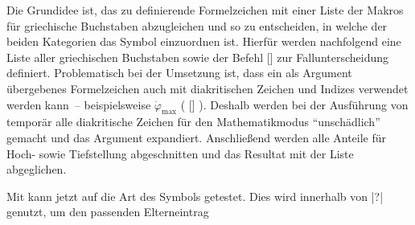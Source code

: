 \documentclass[%
  english,ngerman,%
  cdgeometry=no,DIV=12,automark,%
]{tudscrartcl}
\begin{document}
Die Grundidee ist, das zu definierende Formelzeichen mit einer Liste der Makros 
für griechische Buchstaben abzugleichen und so zu entscheiden, in welche der 
beiden Kategorien das Symbol einzuordnen ist. Hierfür werden nachfolgend eine 
Liste  aller griechischen Buchstaben sowie der Befehl 
[] 
zur Fallunterscheidung definiert. Problematisch bei der Umsetzung ist, dass ein 
als Argument übergebenes Formelzeichen auch mit diakritischen Zeichen und 
Indizes verwendet werden kann~-- beispielsweise $\dot{\varphi}_{\mathrm{max}}$
(%
  []\PValue{\textunderscore}%
). Deshalb werden bei der Ausführung von  temporär alle 
diakritische Zeichen für den Mathematikmodus \enquote{unschädlich} gemacht und 
das Argument  expandiert. Anschließend werden alle Anteile 
für Hoch- sowie Tiefstellung abgeschnitten und das Resultat mit der Liste 
 abgeglichen.
%
\CodeHook{\let\newcommand\renewcommand}
\begin{Hint*}
\makeatletter
\newcommand*\greeksymbollist{}
\def\@tempa#1{\ifdefvoid{#1}{}{\listadd\greeksymbollist{#1}}}
\forcsvlist{\@tempa}{%
  \alpha,\beta,\varbeta,\gamma,\delta,\epsilon,\varepsilon,\zeta,%
  \eta,\theta,\vartheta,\iota,\kappa,\varkappa,\lambda,\mu,\nu,%
  \xi,\omicron,\pi,\varpi,\rho,\varrho,\sigma,\varsigma,\tau,%
  \upsilon,\phi,\varphi,\chi,\psi,\omega,%
  \Alpha,\Beta,\Gamma,\Delta,\Epsilon,\Zeta,\Eta,\Theta,\Iota,%
  \Kappa,\Lambda,\Mu,\Nu,\Xi,\Omicron,\Pi,\Rho,\Sigma,\Tau,\Upsilon,%
  \Phi,\Chi,\Psi,\Omega%
}
\newcommand*\ifisgreeksymbol[1]{%
  \begingroup%
    \def\@tempa##1{\let##1\@firstofone}%
    \forcsvlist{\@tempa}{%
      \acute,\bar,\breve,\check,\dot,\ddot,\dddot,\ddddot,%
      \hat,\widehat,\grave,\tilde,\widetilde,\vec,%
      \Acute,\Bar,\Breve,\Check,\Dot,\Ddot,\Hat,\Grave,\Tilde,\Vec%
    }%
    \protected@edef\@tempa{#1}%
    \def\@tempb##1_##2\relax{\def\@tempa{##1}}%
    \expandafter\@tempb\@tempa_\relax\relax%
    \def\@tempb##1^##2\relax{\def\@tempa{##1}}%
    \expandafter\@tempb\@tempa^\relax\relax%
    \expandafter\ifinlist\expandafter{\@tempa}{\greeksymbollist}{%
      \aftergroup\@firstoftwo%
    }{%
      \aftergroup\@secondoftwo%
    }%
  \endgroup%
}
\makeatother
\end{Hint*}
%
Mit  kann jetzt auf die Art des Symbols getestet. Dies 
wird innerhalb von |?| genutzt, um den passenden Elterneintrag 
\end{document}
